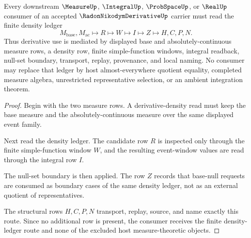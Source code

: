 \begin{theorem}
\label{thm:radon-nikodym-derivative-density-ledger-route}
Every downstream $\MeasureUp$, $\IntegralUp$, $\ProbSpaceUp$, or $\RealUp$ consumer of an accepted $\RadonNikodymDerivativeUp$ carrier must read the finite density ledger
$$
M_{\mathrm{base}},M_{\mathrm{ac}} \longmapsto R \longmapsto W \longmapsto I \longmapsto Z \longmapsto H,C,P,N .
$$
Thus derivative use is mediated by displayed base and absolutely-continuous measure rows, a density row, finite simple-function windows, integral readback, null-set boundary, transport, replay, provenance, and local naming. No consumer may replace that ledger by host almost-everywhere quotient equality, completed measure algebra, unrestricted representative selection, or an ambient integration theorem.
\end{theorem}
\begin{proof}
Begin with the two measure rows. A derivative-density read must keep the base measure and the absolutely-continuous measure over the same displayed event family.

Next read the density ledger. The candidate row $R$ is inspected only through the finite simple-function window $W$, and the resulting event-window values are read through the integral row $I$.

The null-set boundary is then applied. The row $Z$ records that base-null requests are consumed as boundary cases of the same density ledger, not as an external quotient of representatives.

The structural rows $H,C,P,N$ transport, replay, source, and name exactly this route. Since no additional row is present, the consumer receives the finite density-ledger route and none of the excluded host measure-theoretic objects.
\end{proof}



